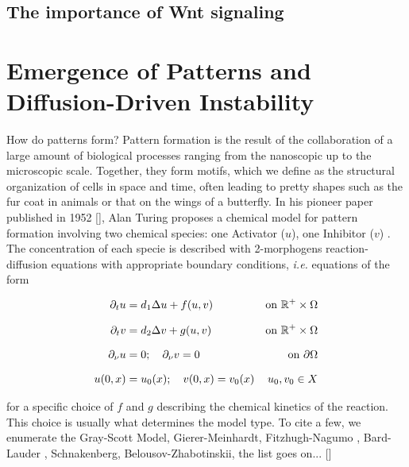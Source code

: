 \subsection{The importance of Wnt signaling}

\section{Emergence of Patterns and Diffusion-Driven Instability}
How do patterns form? Pattern formation is the result of the collaboration of a large amount of biological processes ranging from the nanoscopic up to the microscopic scale. Together, they form motifs, which we define as the structural organization of cells in space and time, often leading to pretty shapes such as the fur coat in animals or that on the wings of a butterfly. In his pioneer paper  published in 1952 [], Alan Turing proposes a chemical model for pattern formation involving two chemical species: one Activator ($u$), one Inhibitor ($v$) . The concentration of each specie is described with 2-morphogens reaction-diffusion equations with appropriate boundary conditions, \textit{i.e.} equations of the form 


\begin{align}
	\del_t u &= d_1 \lap u + f(u, v) &\text{on} \ \R^{+} \times \Omega \notag \\[0.7em]
	\del_t v &= d_2 \lap v + g(u, v) & \text{on} \ \R^{+} \times \Omega \\[0.7em]
	\del_\nu u & = 0; \quad \del_\nu v = 0 & \text{on} \ \del\Omega \notag \\[0.7em]
	u(0, x) &= u_0(x) ; \quad v(0, x) = v_0(x) & u_0, v_0 \in X
\end{align}
\label{eq:TuringModel}


for a specific choice of $f$ and $g$ describing the chemical kinetics of the reaction. This choice is usually what determines the model type. To cite a few, we enumerate the Gray-Scott Model,  Gierer-Meinhardt, Fitzhugh-Nagumo , Bard-Lauder , Schnakenberg, Belousov-Zhabotinskii, the list goes on... []

